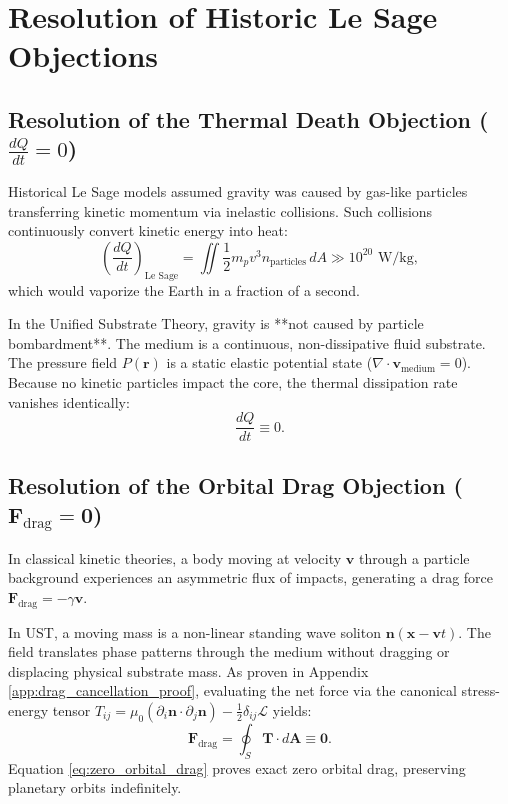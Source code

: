 \documentclass[11pt,a4paper]{article}
\begin{document}
	\section{Resolution of Historic Le Sage Objections}
	\label{sec:lesage_resolution}
	
	\subsection{Resolution of the Thermal Death Objection ($\frac{dQ}{dt} = 0$)}
	Historical Le Sage models assumed gravity was caused by gas-like particles transferring kinetic momentum via inelastic collisions. Such collisions continuously convert kinetic energy into heat:
	\begin{equation}
		\left(\frac{dQ}{dt}\right)_{\text{Le Sage}} = \iint \frac{1}{2} m_p v^3 n_{\text{particles}} \, dA \gg 10^{20} \text{ W/kg},
	\end{equation}
	which would vaporize the Earth in a fraction of a second.
	
	In the Unified Substrate Theory, gravity is **not caused by particle bombardment**. The medium is a continuous, non-dissipative fluid substrate. The pressure field $P(\mathbf{r})$ is a static elastic potential state ($\nabla \cdot \mathbf{v}_{\text{medium}} = 0$). Because no kinetic particles impact the core, the thermal dissipation rate vanishes identically:
	\begin{equation}
		\frac{dQ}{dt} \equiv 0.
		\label{eq:zero_thermal_heating}
	\end{equation}
	
	\subsection{Resolution of the Orbital Drag Objection ($\mathbf{F}_{\text{drag}} = \mathbf{0}$)}
	In classical kinetic theories, a body moving at velocity $\mathbf{v}$ through a particle background experiences an asymmetric flux of impacts, generating a drag force $\mathbf{F}_{\text{drag}} = -\gamma \mathbf{v}$.
	
	In UST, a moving mass is a non-linear standing wave soliton $\mathbf{n}(\mathbf{x} - \mathbf{v}t)$. The field translates phase patterns through the medium without dragging or displacing physical substrate mass. As proven in Appendix \ref{app:drag_cancellation_proof}, evaluating the net force via the canonical stress-energy tensor $T_{ij} = \mu_0 (\partial_i \mathbf{n} \cdot \partial_j \mathbf{n}) - \frac{1}{2}\delta_{ij}\mathcal{L}$ yields:
	\begin{equation}
		\mathbf{F}_{\text{drag}} = \oint_S \mathbf{T} \cdot d\mathbf{A} \equiv \mathbf{0}.
		\label{eq:zero_orbital_drag}
	\end{equation}
	Equation \eqref{eq:zero_orbital_drag} proves exact zero orbital drag, preserving planetary orbits indefinitely.
	
\end{document}
